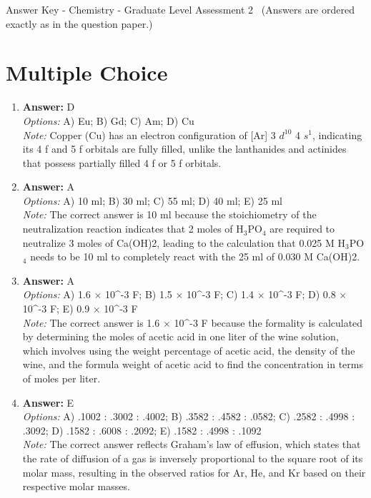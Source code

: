 \documentclass[12pt]{article}
\begin{document}
\begin{center}
Answer Key - Chemistry - Graduate Level Assessment 2 \
\small (Answers are ordered exactly as in the question paper.)
\end{center}

\section*{Multiple Choice}
\begin{enumerate}[label=\arabic*.]
\item \textbf{Answer:} D
\\ \textit{Options:} A) Eu; B) Gd; C) Am; D) Cu
\\ \textit{Note:} Copper (Cu) has an electron configuration of [Ar] 3 $d^10$ 4 $s^1$, indicating its 4 f and 5 f orbitals are fully filled, unlike the lanthanides and actinides that possess partially filled 4 f or 5 f orbitals.
\item \textbf{Answer:} A
\\ \textit{Options:} A) 10 ml; B) 30 ml; C) 55 ml; D) 40 ml; E) 25 ml
\\ \textit{Note:} The correct answer is 10 ml because the stoichiometry of the neutralization reaction indicates that 2 moles of H$_{3}$PO$_{4}$ are required to neutralize 3 moles of Ca(OH)2, leading to the calculation that 0.025 M H$_{3}$PO$_{4}$ needs to be 10 ml to completely react with the 25 ml of 0.030 M Ca(OH)2.
\item \textbf{Answer:} A
\\ \textit{Options:} A) 1.6 \ensuremath{\times} 10^-3 F; B) 1.5 \ensuremath{\times} 10^-3 F; C) 1.4 \ensuremath{\times} 10^-3 F; D) 0.8 \ensuremath{\times} 10^-3 F; E) 0.9 \ensuremath{\times} 10^-3 F
\\ \textit{Note:} The correct answer is 1.6 × 10^-3 F because the formality is calculated by determining the moles of acetic acid in one liter of the wine solution, which involves using the weight percentage of acetic acid, the density of the wine, and the formula weight of acetic acid to find the concentration in terms of moles per liter.
\item \textbf{Answer:} E
\\ \textit{Options:} A) .1002 : .3002 : .4002; B) .3582 : .4582 : .0582; C) .2582 : .4998 : .3092; D) .1582 : .6008 : .2092; E) .1582 : .4998 : .1092
\\ \textit{Note:} The correct answer reflects Graham's law of effusion, which states that the rate of diffusion of a gas is inversely proportional to the square root of its molar mass, resulting in the observed ratios for Ar, He, and Kr based on their respective molar masses.

\end{enumerate}
\end{document}
